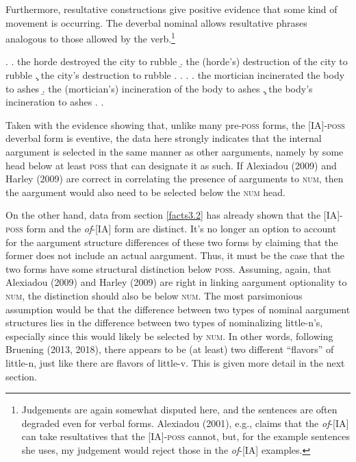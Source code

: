 \documentclass[12pt]{article}
\begin{document}
Furthermore, resultative constructions give positive evidence that some kind of movement is occurring. The deverbal nominal allows resultative phrases analogous to those allowed by the verb.\footnote{ Judgements are again somewhat disputed here, and the sentences are often degraded even for verbal forms. Alexiadou (2001), e.g., claims that the \textit{of}-[IA] can take resultatives that the [IA]-\textsc{poss} cannot, but, for the example sentences she uses, my judgement would reject those in the \textit{of}-[IA] examples.}

\singlespacing
\ex. 
\a. the horde destroyed the city to rubble
\b. the (horde's) destruction of the city to rubble
\c. the city's destruction to rubble
\z. \z. 
\ex. 
\a. the mortician incinerated the body to ashes
\b. the (mortician's) incineration of the body to ashes
\c. the body's incineration to ashes
\z. \z. \par \par


\doublespacing

Taken with the evidence showing that, unlike many pre-\textsc{poss} forms, the [IA]-\textsc{poss} deverbal form is eventive, the data here strongly indicates that the internal aargument is selected in the same manner as other aarguments, namely by some head below at least \textsc{poss} that can designate it as such. If Alexiadou (2009) and Harley (2009) are correct in correlating the presence of aarguments to \textsc{num}, then the aargument would also need to be selected below the \textsc{num} head.

On the other hand, data from section \ref{facts3.2} has already shown that the [IA]-\textsc{poss} form and the \textit{of}-[IA] form are distinct. It's no longer an option to account for the aargument structure differences of these two forms by claiming that the former does not include an actual aargument. Thus, it must be the case that the two forms have some structural distinction below \textsc{poss}. Assuming, again, that Alexiadou (2009) and Harley (2009) are right in linking aargument optionality to \textsc{num}, the distinction should also be below \textsc{num}. The most parsimonious assumption would be that the difference between two types of nominal aargument structures lies in the difference between two types of nominalizing little-n's, especially since this would likely be selected by \textsc{num}. In other words, following Bruening (2013, 2018), there appears to be (at least) two different ``flavors'' of little-n, just like there are flavors of little-v. This is given more detail in the next section.
\end{document}
